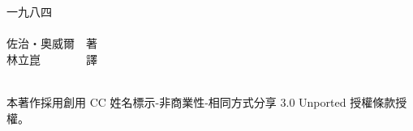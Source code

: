 \pagestyle{empty}
\setlength{\parindent}{0em}
{\HUGE 一九八四} \\ \\
{\large 佐治・奧威爾　著\\
林立崑　　　　譯} \\ \\
\begin{vplace}[20]
\normalsize 本著作採用創用 CC 姓名標示-非商業性-相同方式分享 3.0 Unported 授權條款授權。
\end{vplace}
\cleardoublepage
